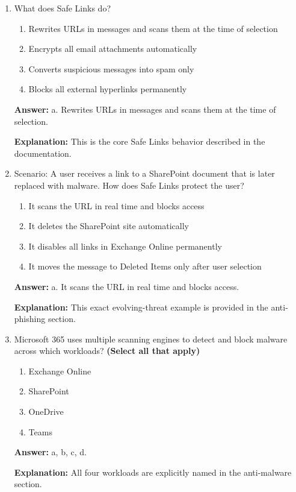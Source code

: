 \documentclass[10pt]{article}
\begin{document}
\begin{enumerate}[leftmargin=*]
\textbf{Explanation:} this exact example to describe character substitution deception.

\item What does Safe Links do?
\begin{enumerate}[label=\alph*., leftmargin=1.5em]
\item Rewrites URLs in messages and scans them at the time of selection
\item Encrypts all email attachments automatically
\item Converts suspicious messages into spam only
\item Blocks all external hyperlinks permanently
\end{enumerate}
\textbf{Answer:} a. Rewrites URLs in messages and scans them at the time of selection.

\textbf{Explanation:} This is the core Safe Links behavior described in the documentation.

\item Scenario: A user receives a link to a SharePoint document that is later replaced with malware. How does Safe Links protect the user?
\begin{enumerate}[label=\alph*., leftmargin=1.5em]
\item It scans the URL in real time and blocks access
\item It deletes the SharePoint site automatically
\item It disables all links in Exchange Online permanently
\item It moves the message to Deleted Items only after user selection
\end{enumerate}
\textbf{Answer:} a. It scans the URL in real time and blocks access.

\textbf{Explanation:} This exact evolving-threat example is provided in the anti-phishing section.

\item Microsoft 365 uses multiple scanning engines to detect and block malware across which workloads? \textbf{(Select all that apply)}
\begin{enumerate}[label=\alph*., leftmargin=1.5em]
\item Exchange Online
\item SharePoint
\item OneDrive
\item Teams
\end{enumerate}
\textbf{Answer:} a, b, c, d.

\textbf{Explanation:} All four workloads are explicitly named in the anti-malware section.


\end{enumerate}
\end{document}
